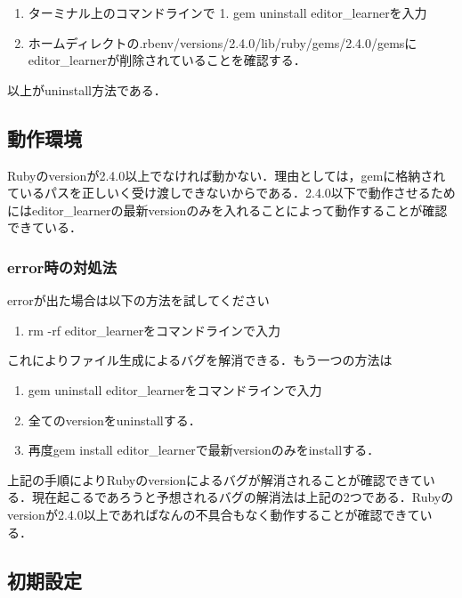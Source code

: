 \documentclass[11pt,dvipdfmx]{jsarticle}
\providecommand{\tightlist}{%
      \setlength{\itemsep}{0pt}\setlength{\parskip}{0pt}}
\begin{document}
\begin{enumerate}
\def\labelenumi{\arabic{enumi}.}
\tightlist
\item
  ターミナル上のコマンドラインで 1. gem uninstall editor\_learnerを入力
\item
  ホームディレクトの.rbenv/versions/2.4.0/lib/ruby/gems/2.4.0/gemsにeditor\_learnerが削除されていることを確認する．
\end{enumerate}

以上がuninstall方法である．

    \subsection{動作環境}\label{ux52d5ux4f5cux74b0ux5883}

    Rubyのversionが2.4.0以上でなければ動かない．理由としては，gemに格納されているパスを正しいく受け渡しできないからである．2.4.0以下で動作させるためにはeditor\_learnerの最新versionのみを入れることによって動作することが確認できている．

\subsubsection{error時の対処法}\label{errorux6642ux306eux5bfeux51e6ux6cd5}

errorが出た場合は以下の方法を試してください

\begin{enumerate}
\def\labelenumi{\arabic{enumi}.}
\tightlist
\item
  rm -rf editor\_learnerをコマンドラインで入力
\end{enumerate}

これによりファイル生成によるバグを解消できる．もう一つの方法は

\begin{enumerate}
\def\labelenumi{\arabic{enumi}.}
\tightlist
\item
  gem uninstall editor\_learnerをコマンドラインで入力
\item
  全てのversionをuninstallする．
\item
  再度gem install editor\_learnerで最新versionのみをinstallする．
\end{enumerate}

上記の手順によりRubyのversionによるバグが解消されることが確認できている．現在起こるであろうと予想されるバグの解消法は上記の2つである．Rubyのversionが2.4.0以上であればなんの不具合もなく動作することが確認できている．

    \subsection{初期設定}\label{ux521dux671fux8a2dux5b9a}
\end{document}
